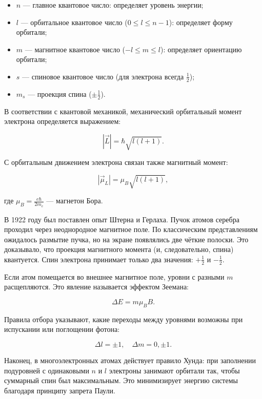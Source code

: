 \begin{itemize}
    \item $n$ — главное квантовое число: определяет уровень энергии;
    \item $l$ — орбитальное квантовое число ($0 \le l \le n - 1$): определяет форму орбитали;
    \item $m$ — магнитное квантовое число ($-l \le m \le l$): определяет ориентацию орбитали;
    \item $s$ — спиновое квантовое число (для электрона всегда $\frac{1}{2}$);
    \item $m_s$ — проекция спина ($\pm\frac{1}{2}$).
\end{itemize}

В соответствии с квантовой механикой, механический орбитальный момент электрона определяется выражением:

$$
|\vec{L}| = \hbar \sqrt{l(l+1)}.
$$

С орбитальным движением электрона связан также магнитный момент:

$$
|\vec{\mu}_L| = \mu_B \sqrt{l(l+1)},
$$

где $\mu_B = \frac{e\hbar}{2m_e}$ — магнетон Бора.

В 1922 году был поставлен опыт Штерна и Герлаха. Пучок атомов серебра проходил через неоднородное магнитное поле. По классическим представлениям ожидалось размытие пучка, но на экране появлялись две чёткие полоски. Это доказывало, что проекция магнитного момента (и, следовательно, спина) квантуется. Спин электрона принимает только два значения: $+\frac{1}{2}$ и $-\frac{1}{2}$.

Если атом помещается во внешнее магнитное поле, уровни с разными $m$ расщепляются. Это явление называется эффектом Зеемана:

$$
\Delta E = m \mu_B B.
$$

Правила отбора указывают, какие переходы между уровнями возможны при испускании или поглощении фотона:

$$
\Delta l = \pm 1, \quad \Delta m = 0, \pm 1.
$$

Наконец, в многоэлектронных атомах действует правило Хунда: при заполнении подуровней с одинаковыми $n$ и $l$ электроны занимают орбитали так, чтобы суммарный спин был максимальным. Это минимизирует энергию системы благодаря принципу запрета Паули.
